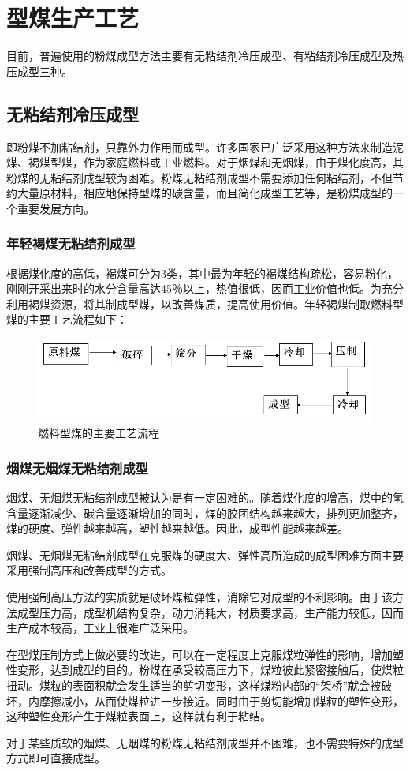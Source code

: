 \documentclass[10pt,openany]{ctexbook}
\begin{document}
\section{型煤生产工艺}
 目前，普遍使用的粉煤成型方法主要有无粘结剂冷压成型、有粘结剂冷压成型及热压成型三种。
 \subsection{无粘结剂冷压成型}
     即粉煤不加粘结剂，只靠外力作用而成型。许多国家已广泛采用这种方法来制造泥煤、褐煤型煤，作为家庭燃料或工业燃料。对于烟煤和无烟煤，由于煤化度高，其粉煤的无粘结剂成型较为困难。粉煤无粘结剂成型不需要添加任何粘结剂，不但节约大量原材料，相应地保持型煤的碳含量，而且简化成型工艺等，是粉煤成型的一个重要发展方向。
\subsubsection{年轻褐煤无粘结剂成型} 根据煤化度的高低，褐煤可分为3类，其中最为年轻的褐煤结构疏松，容易粉化，刚刚开采出来时的水分含量高达45％以上，热值很低，因而工业价值也低。为充分利用褐煤资源，将其制成型煤，以改善煤质，提高使用价值。年轻褐煤制取燃料型煤的主要工艺流程如下：

    \begin{figure}[!ht]
\includegraphics[scale=0.6]{25}
\caption{燃料型煤的主要工艺流程}
\end{figure}

\subsubsection{烟煤无烟煤无粘结剂成型}
烟煤、无烟煤无粘结剂成型被认为是有一定困难的。随着煤化度的增高，煤中的氢含量逐渐减少、碳含量逐渐增加的同时，煤的胶团结构越来越大，排列更加整齐，煤的硬度、弹性越来越高，塑性越来越低。因此，成型性能越来越差。\par
    烟煤、无烟煤无粘结剂成型在克服煤的硬度大、弹性高所造成的成型困难方面主要采用强制高压和改善成型的方式。\par
    使用强制高压方法的实质就是破坏煤粒弹性，消除它对成型的不利影响。由于该方法成型压力高，成型机结构复杂，动力消耗大，材质要求高，生产能力较低，因而生产成本较高，工业上很难广泛采用。\par
    在型煤压制方式上做必要的改进，可以在一定程度上克服煤粒弹性的影响，增加塑性变形，达到成型的目的。粉煤在承受较高压力下，煤粒彼此紧密接触后，使煤粒扭动。煤粒的表面积就会发生适当的剪切变形，这样煤粉内部的“架桥”就会被破坏，内摩擦减小，从而使煤粒进一步接近。同时由于剪切能增加煤粒的塑性变形，这种塑性变形产生于煤粒表面上，这样就有利于粘结。\par
    对于某些质软的烟煤、无烟煤的粉煤无粘结剂成型并不困难，也不需要特殊的成型方式即可直接成型。
\end{document}
